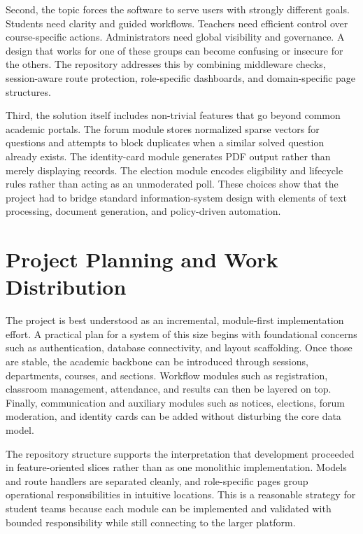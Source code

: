 \documentclass[12pt,a4paper]{report}
\begin{document}
Second, the topic forces the software to serve users with strongly different goals. Students need clarity and guided workflows. Teachers need efficient control over course-specific actions. Administrators need global visibility and governance. A design that works for one of these groups can become confusing or insecure for the others. The repository addresses this by combining middleware checks, session-aware route protection, role-specific dashboards, and domain-specific page structures.

Third, the solution itself includes non-trivial features that go beyond common academic portals. The forum module stores normalized sparse vectors for questions and attempts to block duplicates when a similar solved question already exists. The identity-card module generates PDF output rather than merely displaying records. The election module encodes eligibility and lifecycle rules rather than acting as an unmoderated poll. These choices show that the project had to bridge standard information-system design with elements of text processing, document generation, and policy-driven automation.

\section{Project Planning and Work Distribution}
The project is best understood as an incremental, module-first implementation effort. A practical plan for a system of this size begins with foundational concerns such as authentication, database connectivity, and layout scaffolding. Once those are stable, the academic backbone can be introduced through sessions, departments, courses, and sections. Workflow modules such as registration, classroom management, attendance, and results can then be layered on top. Finally, communication and auxiliary modules such as notices, elections, forum moderation, and identity cards can be added without disturbing the core data model.

The repository structure supports the interpretation that development proceeded in feature-oriented slices rather than as one monolithic implementation. Models and route handlers are separated cleanly, and role-specific pages group operational responsibilities in intuitive locations. This is a reasonable strategy for student teams because each module can be implemented and validated with bounded responsibility while still connecting to the larger platform.
\end{document}
